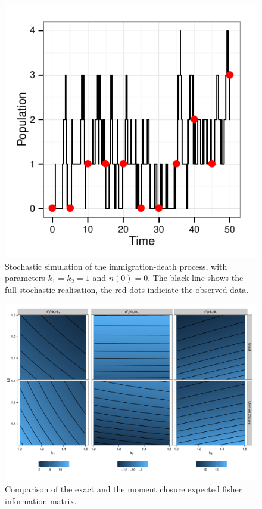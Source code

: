 \documentclass{pnastwo}
\begin{document}



\begin{figure}[ht]
\begin{center}
\centerline{\includegraphics[]{../graphics/figure1}}
\end{center}
\caption{Stochastic simulation of the immigration-death process, with parameters
$k_1=k_2=1$ and $n(0)=0$. The black line shows the full stochastic realisation, 
the red dots indiciate the observed data.}\label{F1}
\end{figure}
\begin{figure}[ht]
\begin{center}
\centerline{\includegraphics[width=.7\textwidth]{../graphics/figure2}}
\caption{Comparison of the exact and the moment closure expected fisher information matrix. }
\label{F2}
\end{center}
\end{figure}
% 
\end{document}
